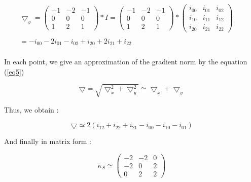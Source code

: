 \documentclass[12pt,a4paper]{article}
\begin{document}
\vspace{1cm}

\begin{equation}\label{eq4}
\begin{matrix}
\bigtriangledown_y = \begin{pmatrix}
-1 & -2 & -1 \\ 
0 & 0 & 0 \\ 
1 & 2 & 1
\end{pmatrix}*I  = \begin{pmatrix}
-1 & -2 & -1 \\ 
0 & 0 & 0 \\ 
1 & 2 & 1
\end{pmatrix}* \begin{pmatrix}
i_{00} & i_{01} & i_{02} \\ 
i_{10} & i_{11} & i_{12}\\ 
i_{20} & i_{21} & i_{22}
\end{pmatrix}  \\ 
& & \\
 =  -i_{00}-2i_{01}-i_{02}+i_{20}+2i_{21}+i_{22} \\ 
\end{matrix}
\end{equation}
 
\vspace{0.5cm}

In each point, we give an approximation of the gradient norm by the equation (\ref{eq5})

\begin{equation}\label{eq5}
\bigtriangledown = \sqrt{\bigtriangledown_x^2 + \bigtriangledown_y^2 } \simeq \bigtriangledown_x + \bigtriangledown_y
\end{equation}

\vspace{0.5cm}

Thus, we obtain :

\begin{equation}\label{eq6}
\bigtriangledown \simeq 2(i_{12}+i_{22}+i_{21}-i_{00}-i_{10}-i_{01})
\end{equation}
 
\vspace{0.25cm}
 
And finally in matrix form : 

\begin{equation}\label{eq7}
\kappa_S  \simeq \begin{pmatrix}
-2 & -2 & 0\\ 
-2 & 0 & 2\\ 
 0 & 2 & 2
\end{pmatrix}
\end{equation}
\end{document}
